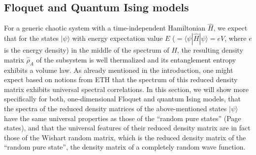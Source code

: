 \documentclass[aps,prb,preprint,onecolumn,amsmath,amssymb,superscriptaddress,eqsecnum,floatfix,scrartcl]{revtex4-1}
\begin{document}
\subsection{Floquet and  Quantum Ising models}
\label{SubSectionFloquetAndQuantumIsingModels}


For a generic chaotic system with a time-independent Hamiltonian ${\hat H}$, we expect that for the states
$|\psi\rangle$ with energy expectation value $E$ ($=\langle \psi |{\hat H} | \psi \rangle = e V$, where $e$ is the energy density)
 in the middle of the spectrum of ${\hat H}$, the resulting density matrix ${\hat \rho}_A$ of the subsystem is well thermalized and
its entanglement entropy exhibits a volume law.
As already  mentioned in the introduction,  one 
might expect  based on 
notions from  ETH that the spectrum of
this reduced density matrix exhibits universal spectral correlations.
%
In this section, we will 
show more specifically 
for both, one-dimensional  Floquet and quantum Ising models, that 
the spectra of the reduced density matrices of the above-mentioned states $|\psi\rangle$  
have the same universal properties as those of the ``random
pure states''  (Page states), and that the universal features of their reduced density matrix 
are  in fact 
those of  the Wishart random matrix, which is the reduced
density matrix of the ``random pure state'', the density matrix of a completely random wave function.
\end{document}
